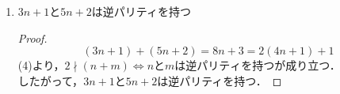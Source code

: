 \documentclass[a4paper,12pt]{ltjsarticle}
\begin{document}
\begin{enumerate}[(1)]
\begin{proof}
\begin{itemize}
\begin{enumerate}[(I)]
                            \begin{equation*}
                                3n + 5m = 3(2k + 1) + 5(2l) = 6k + 10l + 3 = 2(3k + 5l + 1) + 1
                            \end{equation*}
                    \end{enumerate}
                \item $2 \mid (3n + 5m) \Leftarrow nとmは同パリティを持つ$ \\
                    \begin{enumerate}[(I)]
                        \item $2 \mid n, 2 \mid m$のとき$n = 2k, m = 2l$とおいて
                            \begin{equation*}
                                3n + 5m = 3(2k) + 5(2l) = 6k + 10l = 2(3k + 5l)
                            \end{equation*}
                        \item $2 \nmid n, 2 \nmid m$のとき$n = 2k + 1, m = 2l + 1$とおいて
                            \begin{equation*}
                                3n + 5m = 3(2k + 1) + 5(2l + 1) = 6k + 10l + 8 = 2(3k + 5l + 4)
                            \end{equation*}
                    \end{enumerate}
            \end{itemize}
            以上より$2 \mid (3n + 5m) \Leftrightarrow nとmは同パリティを持つ$
        \end{proof}
    \item $3n + 1$と$5n + 2$は逆パリティを持つ
        \begin{proof}
            \begin{equation*}
                (3n + 1) + (5n + 2) = 8n + 3 = 2(4n + 1) + 1
            \end{equation*}
            (4)より，$2 \nmid (n + m) \Leftrightarrow nとmは逆パリティを持つ$が成り立つ． \\
            したがって，$3n + 1$と$5n + 2$は逆パリティを持つ．
        \end{proof}
\end{enumerate}
\end{document}
